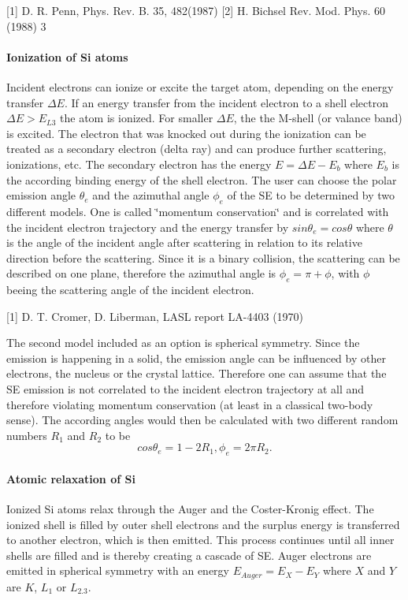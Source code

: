 \mbox{[}1\mbox{]} D. R. Penn, Phys. Rev. B. 35, 482(1987) \mbox{[}2\mbox{]} H. Bichsel Rev. Mod. Phys. 60 (1988) 3\hypertarget{_k_e_s_s_physics_ionization}{}\paragraph{Ionization of Si atoms}\label{_k_e_s_s_physics_ionization}
Incident electrons can ionize or excite the target atom, depending on the energy transfer $\Delta E $. If an energy transfer from the incident electron to a shell electron $\Delta E>E_{L3}$ the atom is ionized. For smaller $\Delta E $, the the M-\/shell (or valance band) is excited. The electron that was knocked out during the ionization can be treated as a secondary electron (delta ray) and can produce further scattering, ionizations, etc. The secondary electron has the energy $ E=\Delta E-E_b$ where $E_b$ is the according binding energy of the shell electron. The user can choose the polar emission angle $ \theta_e $ and the azimuthal angle $ \phi_e $ of the SE to be determined by two different models. One is called \char`\"{}momentum conservation\char`\"{} and is correlated with the incident electron trajectory and the energy transfer by $ sin \theta_e = cos \theta $ where $ \theta $ is the angle of the incident angle after scattering in relation to its relative direction before the scattering. Since it is a binary collision, the scattering can be described on one plane, therefore the azimuthal angle is $ \phi_e =\pi + \phi $, with $\phi $ beeing the scattering angle of the incident electron.

\mbox{[}1\mbox{]} D. T. Cromer, D. Liberman, LASL report LA-\/4403 (1970)

The second model included as an option is spherical symmetry. Since the emission is happening in a solid, the emission angle can be influenced by other electrons, the nucleus or the crystal lattice. Therefore one can assume that the SE emission is not correlated to the incident electron trajectory at all and therefore violating momentum conservation (at least in a classical two-\/body sense). The according angles would then be calculated with two different random numbers $ R_1 $ and $ R_2 $ to be \[ cos \theta_e=1-2R_1, \phi_e =2\pi R_2.\]\hypertarget{_k_e_s_s_physics_relaxation}{}\paragraph{Atomic relaxation of Si}\label{_k_e_s_s_physics_relaxation}
Ionized Si atoms relax through the Auger and the Coster-\/Kronig effect. The ionized shell is filled by outer shell electrons and the surplus energy is transferred to another electron, which is then emitted. This process continues until all inner shells are filled and is thereby creating a cascade of SE. Auger electrons are emitted in spherical symmetry with an energy $ E_{Auger}=E_X-E_Y $ where $ X $ and $ Y $ are $K $, $L_1 $ or $ L_{2.3}$.

